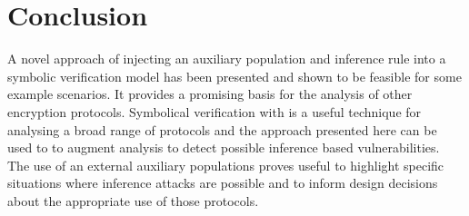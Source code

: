 \documentclass[runningheads]{llncs}
\begin{document}



\section{Conclusion}
A novel approach of injecting an auxiliary population and inference rule into a symbolic verification model has been presented and shown to be feasible for some example scenarios. It provides a promising basis for the analysis of other encryption protocols.	Symbolical verification with \tamarin{} is a useful technique for analysing a broad range of protocols and the approach presented here can be used to to augment analysis to detect possible inference based vulnerabilities. The use of an external auxiliary populations proves useful to highlight specific situations where inference attacks are possible and to inform design decisions about the appropriate use of those protocols.



%
\end{document}
